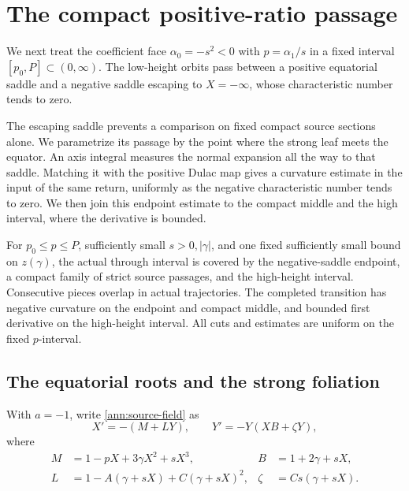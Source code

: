 \section{The compact positive-ratio passage}
\label{sec:compact-positive}

We next treat the coefficient face \(\alpha _0=-s^2<0\) with
\(p=\alpha _1/s\) in a fixed interval \([p_0,P]\subset(0,\infty)\).
The low-height orbits pass between a positive equatorial saddle and
a negative saddle escaping to \(X=-\infty\), whose characteristic
number tends to zero.

The escaping saddle prevents a comparison on fixed compact source
sections alone. We parametrize its passage by the point where the strong
leaf meets the equator. An axis integral measures the normal expansion
all the way to that saddle. Matching it with the positive Dulac map gives
a curvature estimate in the input of the same return, uniformly as the
negative characteristic number tends to zero. We then join this endpoint
estimate to the compact middle and the high interval, where the derivative
is bounded.

\begin{lemma}
\label{ann:lem-compact-positive-domains}
For \(p_0\le p\le P\), sufficiently small \(s>0,|\gamma|\), and one
fixed sufficiently small bound on \(z(\gamma)\), the actual through
interval is covered by the negative-saddle endpoint, a compact family
of strict source passages, and the high-height interval. Consecutive
pieces overlap in actual trajectories. The completed transition has
negative curvature on the endpoint and compact middle, and bounded
first derivative on the high-height interval. All cuts and estimates
are uniform on the fixed \(p\)-interval.
\end{lemma}

\subsection{The equatorial roots and the strong foliation}
\label{ann:subsec-negative-saddle}

With \(a=-1\), write \eqref{ann:source-field} as
\[
 X'=-(M+LY),\qquad Y'=-Y(XB+\zeta Y),
\]
where
\begin{equation}\label{ann:source-coefficients}
\begin{aligned}
 M&=1-pX+3\gamma X^2+sX^3,& B&=1+2\gamma+sX,\\
 L&=1-A(\gamma+sX)+C(\gamma+sX)^2,&
 \zeta&=Cs(\gamma+sX).
\end{aligned}
\end{equation}

